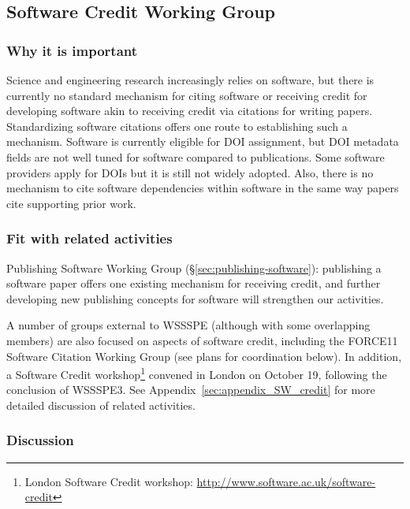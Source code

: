 \subsection{Software Credit Working Group}
\label{sec:software-credit}

\subsubsection{Why it is important}

Science and engineering research increasingly relies on software, but there is currently no standard mechanism for citing software or receiving credit for developing software akin to receiving credit via citations for writing papers.
Standardizing software citations offers one route to establishing such a mechanism.
Software is currently eligible for DOI assignment, but DOI metadata fields are not well tuned for software compared to publications. 
Some software providers apply for DOIs but it is still not widely adopted. 
Also, there is no mechanism to cite software dependencies within software in the same way papers cite supporting prior work.

\subsubsection{Fit with related activities}

Publishing Software Working Group (\S\ref{sec:publishing-software}): publishing a software paper offers one existing mechanism for receiving credit, and further developing new publishing concepts for software will strengthen our activities.

A number of groups external to WSSSPE (although with some overlapping members) are also focused on aspects of software credit, including the FORCE11 Software Citation Working Group (see plans for coordination below).
In addition, a Software Credit workshop\footnote{London Software Credit workshop: \url{http://www.software.ac.uk/software-credit}} convened in London on October 19, following the conclusion of WSSSPE3.
See Appendix~\ref{sec:appendix_SW_credit} for more detailed discussion of related activities.

\subsubsection{Discussion}

